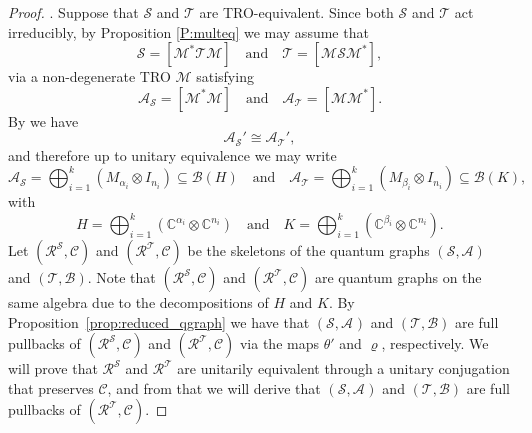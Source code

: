 \documentclass[11pt]{amsart}
\numberwithin{equation}{section}
\theoremstyle{plain}
\theoremstyle{definition}
\theoremstyle{remark}
\newcommand{\A}{{\mathcal{A}}}
\newcommand{\B}{{\mathcal{B}}}
\newcommand{\C}{{\mathcal{C}}}
\newcommand{\M}{{\mathcal{M}}}
\newcommand{\R}{{\mathcal{R}}}
\renewcommand{\S}{{\mathcal{S}}}
\newcommand{\T}{{\mathcal{T}}}
\newcommand{\bC}{\mathbb{C}}
\newcommand{\qand}{\quad\text{and}\quad}
\begin{document}
\begin{proof}
\medskip
{}.
Suppose that $\S$ and $\T$ are TRO-equivalent. Since both $\S$ and $\T$ act irreducibly, by Proposition \ref{P:multeq} we may assume that
\[
\S=[\M^* \T\M] \qand \T=[\M \S \M^*],
\]
via a non-degenerate TRO $\M$ satisfying
\[
\A_{\S}=[\M^*\M]
\qand
\A_{\T}=[\M\M^*].
\]
By \cite[Theorem 3.2]{Ele12} we have 
\[
\A_{\S}'\cong \A_{\T}',
\]
and therefore up to unitary equivalence we may write
\[
\A_{\S}
=
\bigoplus_{i=1}^k (M_{\alpha_i}\otimes I_{n_i})
\subseteq \B(H)
\qand
\A_{\T}
=
\bigoplus_{i=1}^k (M_{\beta_i}\otimes I_{n_i})
\subseteq \B(K),
\]
with
\[
H=\bigoplus_{i=1}^k (\bC^{\alpha_i}\otimes \bC^{n_i})
\qand
K=\bigoplus_{i=1}^k (\bC^{\beta_i}\otimes \bC^{n_i}).
\]
Let $(\R^{\S},\C)$ and $(\R^{\T},\C)$ be the skeletons of the quantum graphs $(\S,\A)$ and $(\T,\B)$. Note that $(\R^{\S},\C)$ and $(\R^{\T},\C)$ are quantum graphs on the same algebra due to the decompositions of $H$ and $K$. By Proposition~\ref{prop:reduced_qgraph} we have that $(\S,\A_{}^{})$ and $(\T,\B)$ are full pullbacks of $(\R^{\S},\C)$ and $(\R^{\T},\C)$ via the maps $\theta'$ and $\varrho$, respectively. We will prove that $\R^{\S}$ and $\R^{\T}$ are unitarily equivalent through a unitary conjugation that preserves $\C$, and from that we will derive that $(\S,\A_{}^{})$ and $(\T,\B)$ are full pullbacks of $(\R^{\T},\C)$.


\end{proof}
\end{document}
